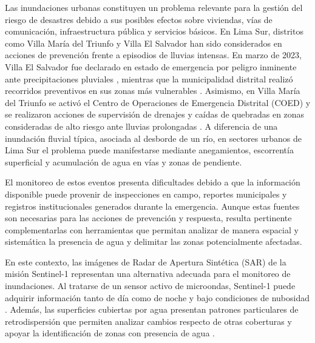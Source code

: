 \documentclass[conference]{IEEEtran}
\begin{document}
Las inundaciones urbanas constituyen un problema relevante para la gestión del riesgo de desastres debido a sus posibles efectos sobre viviendas, vías de comunicación, infraestructura pública y servicios básicos. En Lima Sur, distritos como Villa María del Triunfo y Villa El Salvador han sido considerados en acciones de prevención frente a episodios de lluvias intensas. En marzo de 2023, Villa El Salvador fue declarado en estado de emergencia por peligro inminente ante precipitaciones pluviales \cite{vesEmergencia2023}, mientras que la municipalidad distrital realizó recorridos preventivos en sus zonas más vulnerables \cite{vesLluvias2023}. Asimismo, en Villa María del Triunfo se activó el Centro de Operaciones de Emergencia Distrital (COED) y se realizaron acciones de supervisión de drenajes y caídas de quebradas en zonas consideradas de alto riesgo ante lluvias prolongadas \cite{vmtLluvias2023}. A diferencia de una inundación fluvial típica, asociada al desborde de un río, en sectores urbanos de Lima Sur el problema puede manifestarse mediante anegamientos, escorrentía superficial y acumulación de agua en vías y zonas de pendiente.

El monitoreo de estos eventos presenta dificultades debido a que la información disponible puede provenir de inspecciones en campo, reportes municipales y registros institucionales generados durante la emergencia. Aunque estas fuentes son necesarias para las acciones de prevención y respuesta, resulta pertinente complementarlas con herramientas que permitan analizar de manera espacial y sistemática la presencia de agua y delimitar las zonas potencialmente afectadas.

En este contexto, las imágenes de Radar de Apertura Sintética (SAR) de la misión Sentinel-1 representan una alternativa adecuada para el monitoreo de inundaciones. Al tratarse de un sensor activo de microondas, Sentinel-1 puede adquirir información tanto de día como de noche y bajo condiciones de nubosidad \cite{copernicusSentinel1}. Además, las superficies cubiertas por agua presentan patrones particulares de retrodispersión que permiten analizar cambios respecto de otras coberturas y apoyar la identificación de zonas con presencia de agua \cite{bonafilia2020sen1floods11}.
\end{document}
